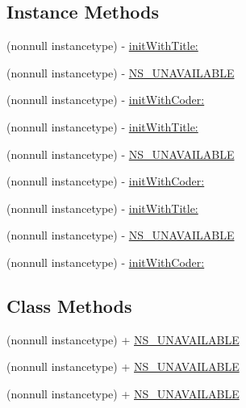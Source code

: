 \subsection*{Instance Methods}
\begin{DoxyCompactItemize}
\item 
(nonnull instancetype) -\/ \mbox{\hyperlink{interface_i_q_title_bar_button_item_a0797747aec7d0205a23e8126af7d3f53}{init\+With\+Title\+:}}
\item 
(nonnull instancetype) -\/ \mbox{\hyperlink{interface_i_q_title_bar_button_item_af033c2737f21ea89fe50f1753f4e8083}{N\+S\+\_\+\+U\+N\+A\+V\+A\+I\+L\+A\+B\+LE}}
\item 
(nonnull instancetype) -\/ \mbox{\hyperlink{interface_i_q_title_bar_button_item_a0e7313fb6699ca445b14fd7b840a736f}{init\+With\+Coder\+:}}
\item 
(nonnull instancetype) -\/ \mbox{\hyperlink{interface_i_q_title_bar_button_item_a0797747aec7d0205a23e8126af7d3f53}{init\+With\+Title\+:}}
\item 
(nonnull instancetype) -\/ \mbox{\hyperlink{interface_i_q_title_bar_button_item_af033c2737f21ea89fe50f1753f4e8083}{N\+S\+\_\+\+U\+N\+A\+V\+A\+I\+L\+A\+B\+LE}}
\item 
(nonnull instancetype) -\/ \mbox{\hyperlink{interface_i_q_title_bar_button_item_a0e7313fb6699ca445b14fd7b840a736f}{init\+With\+Coder\+:}}
\item 
(nonnull instancetype) -\/ \mbox{\hyperlink{interface_i_q_title_bar_button_item_a0797747aec7d0205a23e8126af7d3f53}{init\+With\+Title\+:}}
\item 
(nonnull instancetype) -\/ \mbox{\hyperlink{interface_i_q_title_bar_button_item_af033c2737f21ea89fe50f1753f4e8083}{N\+S\+\_\+\+U\+N\+A\+V\+A\+I\+L\+A\+B\+LE}}
\item 
(nonnull instancetype) -\/ \mbox{\hyperlink{interface_i_q_title_bar_button_item_a0e7313fb6699ca445b14fd7b840a736f}{init\+With\+Coder\+:}}
\end{DoxyCompactItemize}
\subsection*{Class Methods}
\begin{DoxyCompactItemize}
\item 
(nonnull instancetype) + \mbox{\hyperlink{interface_i_q_title_bar_button_item_af033c2737f21ea89fe50f1753f4e8083}{N\+S\+\_\+\+U\+N\+A\+V\+A\+I\+L\+A\+B\+LE}}
\item 
(nonnull instancetype) + \mbox{\hyperlink{interface_i_q_title_bar_button_item_af033c2737f21ea89fe50f1753f4e8083}{N\+S\+\_\+\+U\+N\+A\+V\+A\+I\+L\+A\+B\+LE}}
\item 
(nonnull instancetype) + \mbox{\hyperlink{interface_i_q_title_bar_button_item_af033c2737f21ea89fe50f1753f4e8083}{N\+S\+\_\+\+U\+N\+A\+V\+A\+I\+L\+A\+B\+LE}}
\end{DoxyCompactItemize}
